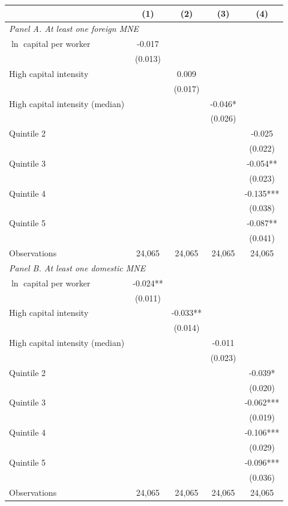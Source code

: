\begin{tabular}{l*{4}{c}}
\toprule
 & (1) & (2) & (3) & (4) \\
\midrule
\multicolumn{5}{l}{\textit{Panel A. At least one foreign MNE}} \\
$\ln$ capital per worker & -0.017 &  &  &  \\
 & (0.013) &  &  &  \\
High capital intensity &  & 0.009 &  &  \\
 &  & (0.017) &  &  \\
High capital intensity (median) &  &  & -0.046* &  \\
 &  &  & (0.026) &  \\
Quintile 2 &  &  &  & -0.025 \\
 &  &  &  & (0.022) \\
Quintile 3 &  &  &  & -0.054** \\
 &  &  &  & (0.023) \\
Quintile 4 &  &  &  & -0.135*** \\
 &  &  &  & (0.038) \\
Quintile 5 &  &  &  & -0.087** \\
 &  &  &  & (0.041) \\
Observations & 24,065 & 24,065 & 24,065 & 24,065 \\
\midrule
\multicolumn{5}{l}{\textit{Panel B. At least one domestic MNE}} \\
$\ln$ capital per worker & -0.024** &  &  &  \\
 & (0.011) &  &  &  \\
High capital intensity &  & -0.033** &  &  \\
 &  & (0.014) &  &  \\
High capital intensity (median) &  &  & -0.011 &  \\
 &  &  & (0.023) &  \\
Quintile 2 &  &  &  & -0.039* \\
 &  &  &  & (0.020) \\
Quintile 3 &  &  &  & -0.062*** \\
 &  &  &  & (0.019) \\
Quintile 4 &  &  &  & -0.106*** \\
 &  &  &  & (0.029) \\
Quintile 5 &  &  &  & -0.096*** \\
 &  &  &  & (0.036) \\
Observations & 24,065 & 24,065 & 24,065 & 24,065 \\
\bottomrule
\end{tabular}
